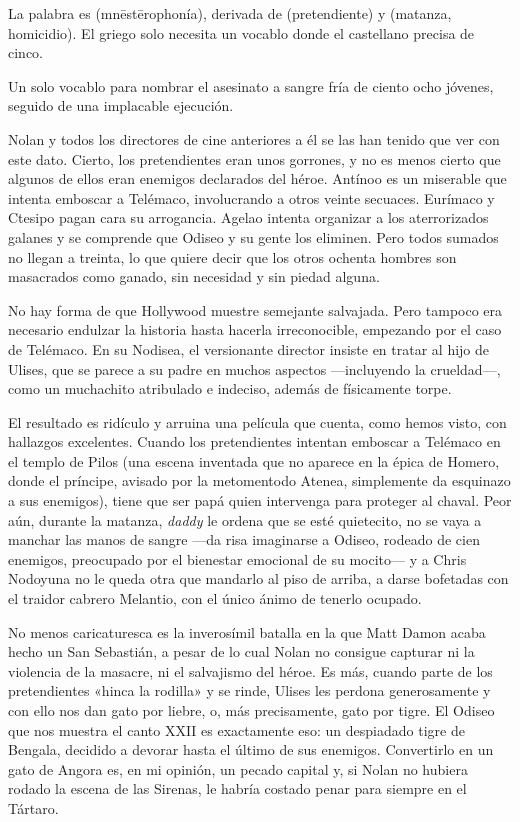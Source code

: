 \label{cap:pretendientes}

La palabra es  (mnēstērophonía), derivada de  (pretendiente) y  (matanza, homicidio). El griego solo necesita un vocablo donde el castellano precisa de cinco.

Un solo vocablo para nombrar el asesinato a sangre fría de ciento ocho jóvenes, seguido de una implacable ejecución.

Nolan y todos los directores de cine anteriores a él se las han tenido que ver con este dato. Cierto, los pretendientes eran unos gorrones, y no es menos cierto que algunos de ellos eran enemigos declarados del héroe. Antínoo es un miserable que intenta emboscar a Telémaco, involucrando a otros veinte secuaces. Eurímaco y Ctesipo pagan cara su arrogancia. Agelao intenta organizar a los aterrorizados galanes y se comprende que Odiseo y su gente los eliminen. Pero todos sumados no llegan a treinta, lo que quiere decir que los otros ochenta hombres son masacrados como ganado, sin necesidad y sin piedad alguna.

No hay forma de que Hollywood muestre semejante salvajada. Pero tampoco era necesario endulzar la historia hasta hacerla irreconocible, empezando por el caso de Telémaco. En su Nodisea, el versionante director insiste en tratar al hijo de Ulises, que se parece a su padre en muchos aspectos ---incluyendo la crueldad---, como un muchachito atribulado e indeciso, además de físicamente torpe.

El resultado es ridículo y arruina una película que cuenta, como hemos visto, con hallazgos excelentes. Cuando los pretendientes intentan emboscar a Telémaco en el templo de Pilos (una escena inventada que no aparece en la épica de Homero, donde el príncipe, avisado por la metomentodo Atenea, simplemente da esquinazo a sus enemigos), tiene que ser papá quien intervenga para proteger al chaval. Peor aún, durante la matanza, \emph{daddy} le ordena que se esté quietecito, no se vaya a manchar las manos de sangre ---da risa imaginarse a Odiseo, rodeado de cien enemigos, preocupado por el bienestar emocional de su mocito--- y a Chris Nodoyuna no le queda otra que mandarlo al piso de arriba, a darse bofetadas con el traidor cabrero Melantio, con el único ánimo de tenerlo ocupado.

No menos caricaturesca es la inverosímil batalla en la que Matt Damon acaba hecho un San Sebastián, a pesar de lo cual Nolan no consigue capturar ni la violencia de la masacre, ni el salvajismo del héroe. Es más, cuando parte de los pretendientes «hinca la rodilla» y se rinde, Ulises les perdona generosamente y con ello nos dan gato por liebre, o, más precisamente, gato por tigre. El Odiseo que nos muestra el canto XXII es exactamente eso: un despiadado tigre de Bengala, decidido a devorar hasta el último de sus enemigos. Convertirlo en un gato de Angora es, en mi opinión, un pecado capital y, si Nolan no hubiera rodado la escena de las Sirenas, le habría costado penar para siempre en el Tártaro.

